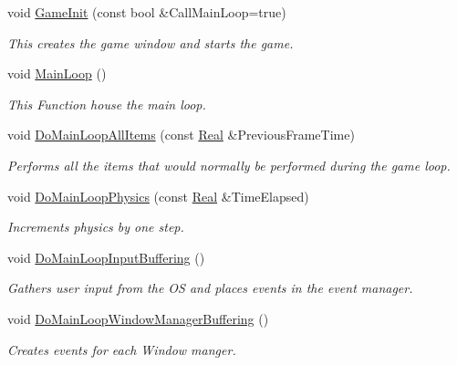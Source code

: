 \begin{DoxyCompactItemize}
void \hyperlink{classphys_1_1World_a21cc36be08a61f40619584d4c438936b}{GameInit} (const bool \&CallMainLoop=true)
\begin{DoxyCompactList}\small\item\em This creates the game window and starts the game. \item\end{DoxyCompactList}\item 
void \hyperlink{classphys_1_1World_af1d9e36d43f5e50543fa2351a32c8362}{MainLoop} ()
\begin{DoxyCompactList}\small\item\em This Function house the main loop. \item\end{DoxyCompactList}\item 
void \hyperlink{classphys_1_1World_a25c2583425bfe3d0d2bfce1093f0175e}{DoMainLoopAllItems} (const \hyperlink{namespacephys_af7eb897198d265b8e868f45240230d5f}{Real} \&PreviousFrameTime)
\begin{DoxyCompactList}\small\item\em Performs all the items that would normally be performed during the game loop. \item\end{DoxyCompactList}\item 
void \hyperlink{classphys_1_1World_a4596a7bd1dc49c3b45b5562fcd0d08f2}{DoMainLoopPhysics} (const \hyperlink{namespacephys_af7eb897198d265b8e868f45240230d5f}{Real} \&TimeElapsed)
\begin{DoxyCompactList}\small\item\em Increments physics by one step. \item\end{DoxyCompactList}\item 
void \hyperlink{classphys_1_1World_af4204b587fcc71e8313dd97d476378d6}{DoMainLoopInputBuffering} ()
\begin{DoxyCompactList}\small\item\em Gathers user input from the OS and places events in the event manager. \item\end{DoxyCompactList}\item 
void \hyperlink{classphys_1_1World_af7bc68e5a19fd4c9c8cc2437485096e1}{DoMainLoopWindowManagerBuffering} ()
\begin{DoxyCompactList}\small\item\em Creates events for each Window manger. \item\end{DoxyCompactList}\item 

\end{DoxyCompactItemize}
